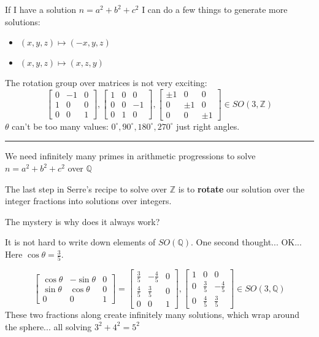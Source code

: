 \documentclass[12pt]{article}
\begin{document}
\noindent If I have a solution $n = a^2 + b^2 + c^2$ I can do a few things to generate more solutions:
\begin{itemize}
\item $(x,y,z) \mapsto (-x,y,z)$
\item $(x,y,z) \mapsto (x,z,y)$
\end{itemize}
The rotation group over matrices is not very exciting:
$$ \left[ \begin{array}{cr|c} 
0 & -1 & 0 \\
1 & 0 & 0 \\ \hline
0 & 0 & 1
\end{array} \right]
, \left[ \begin{array}{c|cr} 
1 & 0 & 0 \\ \hline
0 & 0 & -1  \\
0 & 1 & 0
\end{array} \right] , 
\left[ \begin{array}{c|c|r} 
\pm 1 & 0 & 0 \\ \hline
0 & \pm 1 & 0  \\ \hline
0 & 0 & \pm 1
\end{array} \right]  \in SO( 3, \mathbb{\mathbb{Z}} )$$
$\theta$ can't be too many values: $0^\circ, 90^\circ, 180^\circ, 270^\circ$ just right angles.
\vspace{12pt}
\hrule
\vspace{12pt}
\noindent We need infinitely many primes in arithmetic progressions to solve $n = a^2 + b^2 + c^2$ over $\mathbb{Q}$ \newline

\noindent The last step in Serre's recipe to solve over $\mathbb{Z}$ is to \textbf{rotate} our solution over the integer fractions into solutions over integers.  \newline

\noindent The mystery is why does it always work?
\newpage

It is not hard to write down elements of $SO(\mathbb{Q})$.  One second thought... OK... Here $\cos \theta = \frac{3}{5}$. 

$$  \left[ \begin{array}{cr|c} 
\cos \theta & -\sin \theta & 0 \\
\sin \theta & \cos \theta & 0 \\ \hline
0 & 0 & 1
\end{array} \right] 
=  \left[ \begin{array}{cr|c} 
\frac{3}{5}& -\frac{4}{5} & 0 \\
\frac{4}{5} & \frac{3}{5} & 0 \\ \hline
0 & 0 & 1
\end{array} \right],
\left[ \begin{array}{c|cr} 
1 & 0 & 0 \\ \hline
0 & \frac{3}{5}& -\frac{4}{5}  \\
0 & \frac{4}{5} & \frac{3}{5}  
\end{array} \right]\in SO(3,\mathbb{Q}) $$
 These two fractions along create infinitely many solutions, which wrap around the sphere... all solving $3^2 + 4^2 = 5^2$ \newline
\end{document}
